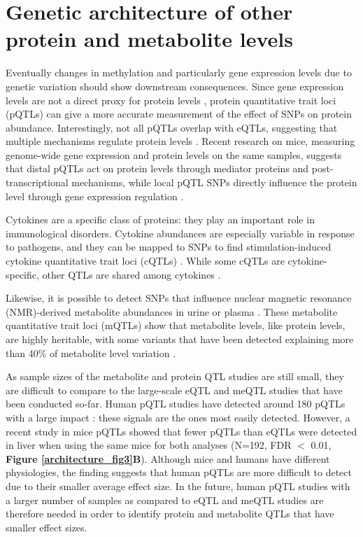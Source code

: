 \section{Genetic architecture of other protein and metabolite levels}
Eventually changes in methylation and particularly gene expression levels due to genetic variation should show downstream consequences. Since gene expression levels are not a direct proxy for protein levels \cite{partsHeritabilityGeneticBasis2014,liuInterdependenceTranscriptProtein2016}, protein quantitative trait loci (pQTLs) can give a more accurate measurement of the effect of SNPs on protein abundance. Interestingly, not all pQTLs overlap with eQTLs, suggesting that multiple mechanisms regulate protein levels \cite{wuVariationGeneticControl2013,liuQuantitativeVariability3422015}. Recent research on mice, measuring genome-wide gene expression and protein levels on the same samples, suggests that distal pQTLs act on protein levels through mediator proteins and post-transcriptional mechanisms, while local pQTL SNPs directly influence the protein level through gene expression regulation \cite{chickDefiningConsequencesGenetic2016}. 

Cytokines are a specific class of proteins: they play an important role in immunological disorders. Cytokine abundances are especially variable in response to pathogens, and they can be mapped to SNPs to find stimulation-induced cytokine quantitative trait loci (cQTLs) \cite{luMappingQuantitativeTrait2011,liInterindividualVariabilityGenetic2016}. While some cQTLs are cytokine-specific, other QTLs are shared among cytokines \cite{liInterindividualVariabilityGenetic2016}.

Likewise, it is possible to detect SNPs that influence nuclear magnetic resonance (NMR)-derived metabolite abundances in urine or plasma \cite{GenomeWideMetabolicQTL,shinAtlasGeneticInfluences2014}. These metabolite quantitative trait loci (mQTLs) show that metabolite levels, like protein levels, are highly heritable, with some variants that have been detected explaining more than 40\% of metabolite level variation \cite{GenomeWideMetabolicQTL}. 

As sample sizes of the metabolite and protein QTL studies are still small, they are difficult to compare to the large-scale eQTL and meQTL studies that have been conducted so-far. Human pQTL studies have detected around 180 pQTLs with a large impact \cite{wuVariationGeneticControl2013}: these signals are the ones most easily detected. However, a recent study in mice pQTLs \cite{chickDefiningConsequencesGenetic2016} showed that fewer pQTLs than eQTLs were detected in liver when using the same mice for both analyses (N=192, FDR $<$ 0.01, \textbf{Figure \ref{architecture_fig3}B}). Although mice and humans have different physiologies, the finding suggests that human pQTLs are more difficult to detect due to their smaller average effect size. In the future, human pQTL studies with a larger number of samples as compared to eQTL and meQTL studies are therefore needed in order to identify protein and metabolite QTLs that have smaller effect sizes.


